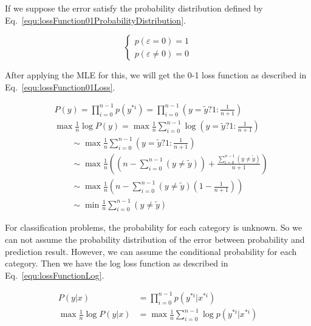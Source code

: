 \documentclass[runningheads,openany]{xhlPaper}
\begin{document}
If we suppose the error satisfy the probability distribution defined by Eq.~\ref{equ:lossFunction01ProbabilityDistribution}.

\begin{equation}
\label{equ:lossFunction01ProbabilityDistribution}
\left\{ {\begin{array}{*{20}{c}}
{p\left( {\varepsilon  = 0} \right) = 1}\\
{p\left( {\varepsilon  \ne 0} \right) = 0}
\end{array}} \right.
\end{equation}

After applying the MLE for this, we will get the 0-1 loss function as described in Eq.~\ref{equ:lossFunction01Loss}.

\begin{equation}
\label{equ:lossFunction01Loss}
\begin{aligned}
&P\left( y \right) = \prod\limits_{i = 0}^{n - 1} {p\left( {{y^{*i}}} \right)}  = \prod\limits_{i = 0}^{n - 1} {\left( {y = \tilde y?1:\frac{1}{{n + 1}}} \right)} \\
&\max \frac{1}{n}\log P\left( y \right) = \max \frac{1}{n}\sum\limits_{i = 0}^{n - 1} {\log \left( {y = \tilde y?1:\frac{1}{{n + 1}}} \right)} \\
 &\quad\quad\sim \max \frac{1}{n}\sum\limits_{i = 0}^{n - 1} {\left( {y = \tilde y?1:\frac{1}{{n + 1}}} \right)} \\
 &\quad\quad\sim \max \frac{1}{n}\left( {\left( {n - \sum\limits_{i = 0}^{n - 1} {\left( {y \ne \tilde y} \right)} } \right) + \frac{{\sum\limits_{i = 0}^{n - 1} {\left( {y \ne \tilde y} \right)} }}{{n + 1}}} \right)\\
 &\quad\quad\sim \max \frac{1}{n}\left( {n - \sum\limits_{i = 0}^{n - 1} {\left( {y \ne \tilde y} \right)} \left( {1 - \frac{1}{{n + 1}}} \right)} \right)\\
 &\quad\quad\sim \min \frac{1}{n}\sum\limits_{i = 0}^{n - 1} {\left( {y \ne \tilde y} \right)} 
\end{aligned}
\end{equation}

For classification problems, the probability for each category is unknown. So we can not assume the probability distribution of the error between probability and prediction result. However, we can assume the conditional probability for each category. Then we have the log loss function as described in Eq.~\ref{equ:lossFunctionLog}.

\begin{equation}
\label{equ:lossFunctionLog}
\begin{aligned}
P\left( {y|x} \right) &= \prod\limits_{i = 0}^{n - 1} {p\left( {{y^{*i}}|{x^{*i}}} \right)} \\
\max \frac{1}{n}\log P\left( {y|x} \right) &= \max \frac{1}{n}\sum\limits_{i = 0}^{n - 1} {\log } p\left( {{y^{*i}}|{x^{*i}}} \right)
\end{aligned}
\end{equation} 
\end{document}
